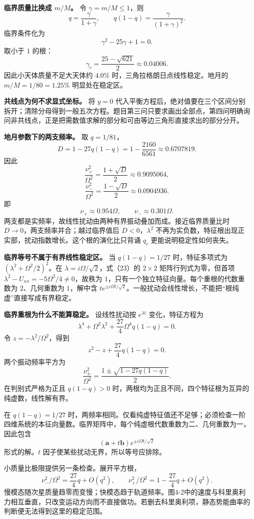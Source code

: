 \documentclass[12pt,a4paper,UTF8]{ctexart}
\begin{document}
\textbf{临界质量比换成 \(m/M\)。} 令 \(\gamma=m/M\le1\)，则 \[
q=\frac{\gamma}{1+\gamma},\qquad
q(1-q)=\frac{\gamma}{(1+\gamma)^2}.
\] 临界条件化为 \[
\gamma^2-25\gamma+1=0.
\] 取小于 \(1\) 的根： \[
\gamma_c=\frac{25-\sqrt{621}}2\approx0.04006.
\] 因此小天体质量不足大天体约 \(4.0\%\)
时，三角拉格朗日点线性稳定。地月的 \(m/M=1/80=1.25\%\) 明显处在稳定区。

\textbf{共线点为何不求显式坐标。} 将 \(y=0\)
代入平衡方程后，绝对值要在三个区间分别拆开；清除分母得到一般五次方程。题目第三问只要求画出全部点，第四问明确询问非共线点，正是把需数值求解的部分和可由等边三角形直接求出的部分分开。

\textbf{地月参数下的两支频率。} 取 \(q=1/81\)， \[
D=1-27q(1-q)
=1-\frac{2160}{6561}
\approx0.6707819.
\] 因此 \[
\frac{\nu_+^2}{\Omega^2}
=\frac{1+\sqrt D}{2}
\approx0.9095064,
\] \[
\frac{\nu_-^2}{\Omega^2}
=\frac{1-\sqrt D}{2}
\approx0.0904936.
\] 即 \[
\nu_+\approx0.954\Omega,\qquad
\nu_-\approx0.301\Omega.
\] 两支都是实频率，故线性扰动由两种有界振动叠加而成。接近临界质量比时
\(D\to0\)，两支频率并合；越过临界值后 \(D<0\)，\(\lambda^2\)
不再为实负数，特征根出现正实部，扰动指数增长。这个根的演化比只背诵
\(q_c\) 更能说明稳定性如何丧失。

\textbf{临界等号不属于有界线性稳定区。} 当 \(q(1-q)=1/27\)
时，特征多项式为 \((\lambda^2+\Omega^2/2)^2\)。在
\(\lambda=i\Omega/\sqrt2\)，式（23）的 \(2\times2\)
矩阵行列式为零，但首项 \(\lambda^2-U_{xx}=-5\Omega^2/4\ne0\)，故秩为
\(1\)，只有一个独立特征向量。每个重根的代数重数为 \(2\)、几何重数为
\(1\)，解中含
\(t e^{\pm i\Omega t/\sqrt2}\)。一般扰动会线性增长，不能把``根纯虚''直接写成有界稳定。

\textbf{临界重根为什么不能算稳定。} 设线性扰动按 \(e^{\lambda t}\)
变化，特征方程为 \[
\lambda^4+\Omega^2\lambda^2+\frac{27}{4}\Omega^4q(1-q)=0.
\] 令 \(z=-\lambda^2/\Omega^2\)，得到 \[
z^2-z+\frac{27}{4}q(1-q)=0.
\] 两个振动频率平方为 \[
\frac{\nu_\pm^2}{\Omega^2}=\frac{1\pm\sqrt{1-27q(1-q)}}2.
\] 在判别式严格为正且 \(q(1-q)>0\)
时，两根均为正且不同，四个特征根为互异的纯虚数，线性解有界。

在 \(q(1-q)=1/27\)
时，两频率相同。仅看纯虚特征值还不足够；必须检查一阶四维系统的本征向量数。临界矩阵中，每个纯虚根代数重数为二、几何重数为一，因此包含
\[
(\bm a+t\bm b)e^{\pm i\Omega t/\sqrt2}
\] 形式的解。\(t\) 因子使某些扰动无界，所以等号应排除。

小质量比极限提供另一条检查。展开平方根， \[
\nu_-^2/\Omega^2=\frac{27}{4}q+O(q^2),\qquad
\nu_+^2/\Omega^2=1-\frac{27}{4}q+O(q^2).
\]
慢模态随次星质量趋零而变慢；快模态趋于轨道频率。图4-2中的速度与科里奥利力相互垂直，只改变运动方向而不直接做功。若删去科里奥利项，静态势能曲率的判断便无法得到这里的稳定范围。
\end{document}

